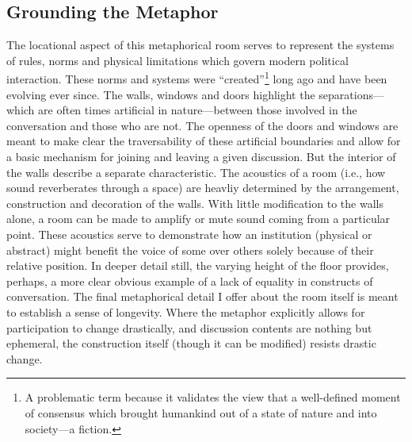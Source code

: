 \documentclass{article}
\begin{document}
\subsection{Grounding the Metaphor}
The locational aspect of this metaphorical room serves to represent the systems of rules, norms and physical limitations which govern modern political interaction.
These norms and systems were ``created''\footnote{A problematic term because it validates the view that a well-defined moment of consensus which brought humankind out of a state of nature and into society---a fiction.} long ago and have been evolving ever since.
The walls, windows and doors highlight the separations---which are often times artificial in nature---between those involved in the conversation and those who are not.
The openness of the doors and windows are meant to make clear the traversability of these artificial boundaries and allow for a basic mechanism for joining and leaving a given discussion.
But the interior of the walls describe a separate characteristic.
The acoustics of a room (i.e., how sound reverberates through a space) are heavliy determined by the arrangement, construction and decoration of the walls.
With little modification to the walls alone, a room can be made to amplify or mute sound coming from a particular point.
These acoustics serve to demonstrate how an institution (physical or abstract) might benefit the voice of some over others solely because of their relative position.
In deeper detail still, the varying height of the floor provides, perhaps, a more clear obvious example of a lack of equality in constructs of conversation.
The final metaphorical detail I offer about the room itself is meant to establish a sense of longevity.
Where the metaphor explicitly allows for participation to change drastically, and discussion contents are nothing but ephemeral, the construction itself (though it can be modified) resists drastic change.
\end{document}
